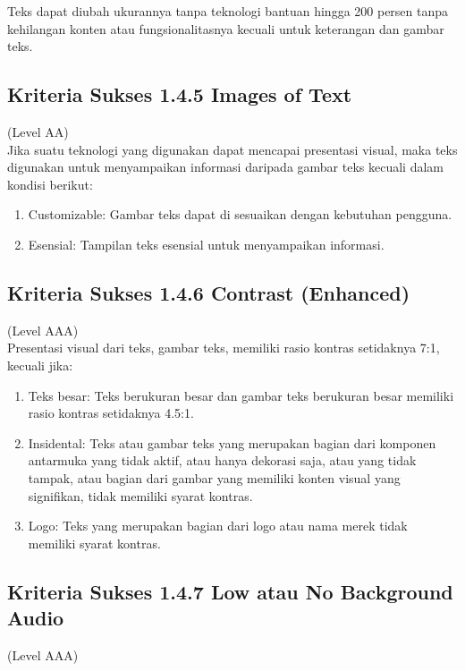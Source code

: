 Teks dapat diubah ukurannya tanpa teknologi bantuan hingga 200 persen tanpa kehilangan konten atau fungsionalitasnya kecuali untuk keterangan dan gambar teks.

\subsection{Kriteria Sukses 1.4.5 Images of Text}
\label{subsec:kriteria_1.4.5}
(Level AA) \\

Jika suatu teknologi yang digunakan dapat mencapai presentasi visual, maka teks digunakan untuk menyampaikan informasi daripada gambar teks kecuali dalam kondisi berikut:

\begin{enumerate}
	\item Customizable: Gambar teks dapat di sesuaikan dengan kebutuhan pengguna.
	\item Esensial: Tampilan teks esensial untuk menyampaikan informasi.
\end{enumerate}

\subsection{Kriteria Sukses 1.4.6 Contrast (Enhanced)}
\label{subsec:kriteria_1.4.6}
(Level AAA) \\

Presentasi visual dari teks, gambar teks, memiliki rasio kontras setidaknya 7:1, kecuali jika:

\begin{enumerate}
	\item Teks besar: Teks berukuran besar dan gambar teks berukuran besar memiliki rasio kontras setidaknya 4.5:1.
	\item Insidental: Teks atau gambar teks yang merupakan bagian dari komponen antarmuka yang tidak aktif, atau hanya dekorasi saja, atau yang tidak tampak, atau bagian dari gambar yang memiliki konten visual yang signifikan, tidak memiliki syarat kontras.
	\item Logo: Teks yang merupakan bagian dari logo atau nama merek tidak memiliki syarat kontras.
\end{enumerate}

\subsection{Kriteria Sukses 1.4.7 Low atau No Background Audio}
\label{subsec:kriteria_1.4.7}
(Level AAA) \\

